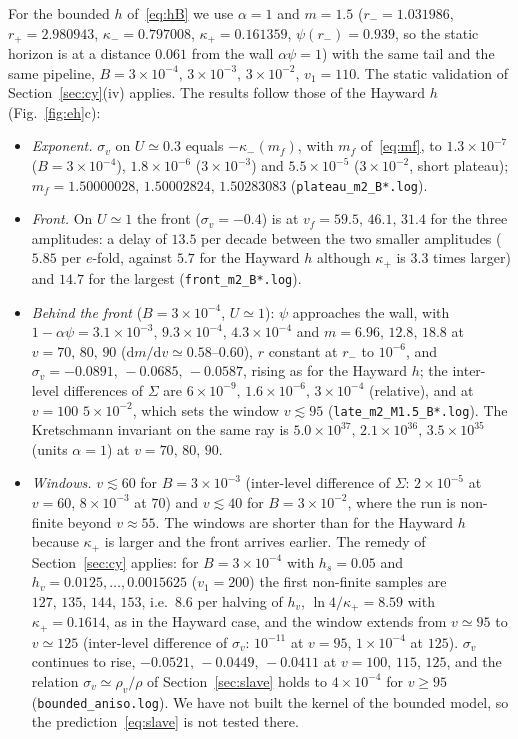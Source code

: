 \documentclass[11pt]{article}
\begin{document}
For the bounded $h$ of~\eqref{eq:hB} we use $\alpha=1$ and $m=1.5$ ($r_-=1.031986$, $r_+=2.980943$, $\kappa_-=0.797008$, $\kappa_+=0.161359$, $\psi(r_-)=0.939$, so the static horizon is at a distance $0.061$ from the wall $\alpha\psi=1$) with the same tail and the same pipeline, $B=3\times10^{-4},\,3\times10^{-3},\,3\times10^{-2}$, $v_1=110$. The static validation of Section~\ref{sec:cy}(iv) applies. The results follow those of the Hayward $h$ (Fig.~\ref{fig:eh}c):
\begin{itemize}
\item \emph{Exponent.} $\sigma_v$ on $U\simeq0.3$ equals $-\kappa_-(m_f)$, with $m_f$ of~\eqref{eq:mf}, to $1.3\times10^{-7}$ ($B=3\times10^{-4}$), $1.8\times10^{-6}$ ($3\times10^{-3}$) and $5.5\times10^{-5}$ ($3\times10^{-2}$, short plateau); $m_f=1.50000028,\,1.50002824,\,1.50283083$ (\texttt{plateau\_m2\_B*.log}).
\item \emph{Front.} On $U\simeq1$ the front ($\sigma_v=-0.4$) is at $v_f=59.5,\,46.1,\,31.4$ for the three amplitudes: a delay of $13.5$ per decade between the two smaller amplitudes ($5.85$ per $e$-fold, against $5.7$ for the Hayward $h$ although $\kappa_+$ is $3.3$ times larger) and $14.7$ for the largest (\texttt{front\_m2\_B*.log}).
\item \emph{Behind the front} ($B=3\times10^{-4}$, $U\simeq1$): $\psi$ approaches the wall, with $1-\alpha\psi=3.1\times10^{-3},\,9.3\times10^{-4},\,4.3\times10^{-4}$ and $m=6.96,\,12.8,\,18.8$ at $v=70,\,80,\,90$ ($\mathrm{d}m/\mathrm{d}v\simeq0.58$--$0.60$), $r$ constant at $r_-$ to $10^{-6}$, and $\sigma_v=-0.0891,\,-0.0685,\,-0.0587$, rising as for the Hayward $h$; the inter-level differences of $\Sigma$ are $6\times10^{-9},\,1.6\times10^{-6},\,3\times10^{-4}$ (relative), and at $v=100$ $5\times10^{-2}$, which sets the window $v\lesssim95$ (\texttt{late\_m2\_M1.5\_B*.log}). The Kretschmann invariant on the same ray is $5.0\times10^{37},\,2.1\times10^{36},\,3.5\times10^{35}$ (units $\alpha=1$) at $v=70,\,80,\,90$.
\item \emph{Windows.} $v\lesssim60$ for $B=3\times10^{-3}$ (inter-level difference of $\Sigma$: $2\times10^{-5}$ at $v=60$, $8\times10^{-3}$ at $70$) and $v\lesssim40$ for $B=3\times10^{-2}$, where the run is non-finite beyond $v\approx55$. The windows are shorter than for the Hayward $h$ because $\kappa_+$ is larger and the front arrives earlier. The remedy of Section~\ref{sec:cy} applies: for $B=3\times10^{-4}$ with $h_s=0.05$ and $h_v=0.0125,\ldots,0.0015625$ ($v_1=200$) the first non-finite samples are $127,\,135,\,144,\,153$, i.e.\ $8.6$ per halving of $h_v$, $\ln4/\kappa_+=8.59$ with $\kappa_+=0.1614$, as in the Hayward case, and the window extends from $v\simeq95$ to $v\simeq125$ (inter-level difference of $\sigma_v$: $10^{-11}$ at $v=95$, $1\times10^{-4}$ at $125$). $\sigma_v$ continues to rise, $-0.0521,\,-0.0449,\,-0.0411$ at $v=100,\,115,\,125$, and the relation $\sigma_v\simeq\rho_v/\rho$ of Section~\ref{sec:slave} holds to $4\times10^{-4}$ for $v\ge95$ (\texttt{bounded\_aniso.log}). We have not built the kernel of the bounded model, so the prediction~\eqref{eq:slave} is not tested there.
\end{itemize}
\end{document}
